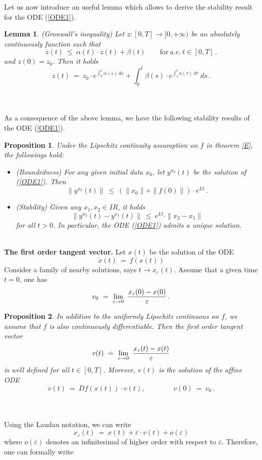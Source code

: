\documentclass[letterpaper,12pt]{article}
\numberwithin{equation}{section}
\newcommand{\R}{\mathbb{R}}
\def\ve{\varepsilon}
\def\R{I\!\!R}
\def\bel{\begin{equation}\label}
\def\eeq{\end{equation}}
\newtheorem{lemma}[theorem]{Lemma}
\newtheorem{proposition}{Proposition}[theorem]
\begin{document}
Let us now introduce an useful lemma which allows to derive the stability result for the ODE (\ref{ODE1}).
\begin{lemma} (Gronwall's inequality) Let $z:[0,T]\to [0,+\infty)$ be an absolutely continuously function such that 
\[
\dot{z}(t)~\leq~\alpha(t)\cdot z(t)+\beta(t)\qquad\mathrm{for}~a.e.~t\in [0,T]\,.
\]
and $z(0)=z_0$. Then it holds
\[
z(t)~=~ z_0\cdot e^{\int_0^t\alpha(s)~ds}+\int_{0}^t\beta(s)\cdot e^{\int_{s}^{t}a(\tau)~d\tau}~ds\,.
\]
\end{lemma} 
\quad\\
\quad\\
As a consequence of the above lemma, we have the following stability results of  the ODE (\ref{ODE1}).
\begin{proposition} Under the Lipschitz continuity assumption on $f$ in theorem \ref{E}, the followings hold:
\begin{itemize}
\item [(i).] {(Boundedness)} For any given initial data $x_0$, let $y^{x_0}(t)$ be the solution of (\ref{ODE1}). Then 
\[
\left\| y^{x_0}(t)\right\|~\leq~(\|x_0\|+\|f(0)\|)\cdot e^{Lt}\,. 
\]
\item [(ii)] (Stability) Given any $x_1,x_2\in\R$, it holds
\[
\| y^{x_2}(t)- y^{x_1}(t)\|~\leq~e^{Lt}\cdot \|x_2-x_1\|
\]
for all $t>0$. In particular, the ODE (\ref{ODE1}) admits a unique solution.
\end{itemize}
\end{proposition}
\quad\\
{\bf The first order tangent vector.} Let $x(t)$ be the solution of the ODE
\[
\dot{x}(t)~=~f(x(t))
\]
Consider a family of nearby solutions, says $t\to x_{\ve}(t)$. Assume that a given time $t=0$, one has
\[
v_0~=~\lim_{\ve\to 0}~{x_{\ve}(0)-x(0)\over \ve}\,.
\]
\begin{proposition} In addition to the uniformly Lipschitz continuous on $f$, we assume that $f$ is also continuously differentiable. Then the first order tangent vector
\[
v(t)~\doteq~\lim_{\ve\to 0}~{x_{\ve}(t)-x(t)\over \ve}
\]
is well defined for all $t\in [0,T]$. Morever, $v(t)$ is the solution of the affine ODE
\bel{tang}
\dot{v}(t)~=~Df(x(t))\cdot v(t),\qquad\qquad v(0)~=~v_0\,.
\eeq
\end{proposition}
\quad\\
\quad\\
Using the Laudau notation, we can write 
\[
x_{\ve}(t)~=~x(t)+\ve\cdot v(t)+o(\ve)
\]
where $o(\ve)$ denotes an infinitesimal of higher order with respect to $\ve$. Therefore, one can formally write
\end{document}
